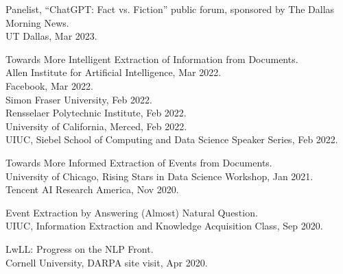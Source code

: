     \noindent Panelist, ``ChatGPT: Fact vs. Fiction'' public forum, sponsored by The Dallas Morning News. \\
    \indent UT Dallas, Mar 2023.

    \noindent Towards More Intelligent Extraction of Information from Documents. \\
    \indent Allen Institute for Artificial Intelligence, Mar 2022. \\
    \indent Facebook, Mar 2022. \\
    \indent Simon Fraser University, Feb 2022. \\
    \indent Rensselaer Polytechnic Institute, Feb 2022. \\
    \indent University of California, Merced, Feb 2022. \\
    \indent UIUC, Siebel School of Computing and Data Science Speaker Series, Feb 2022.

    \noindent Towards More Informed Extraction of Events from Documents. \\
    \indent University of Chicago, Rising Stars in Data Science Workshop, Jan 2021. \\
    \indent Tencent AI Research America, Nov 2020.

    \noindent Event Extraction by Answering (Almost) Natural Question. \\
    \indent UIUC, Information Extraction and Knowledge Acquisition Class, Sep 2020.

    \noindent LwLL: Progress on the NLP Front. \\
    \indent Cornell University, DARPA site visit, Apr 2020.
